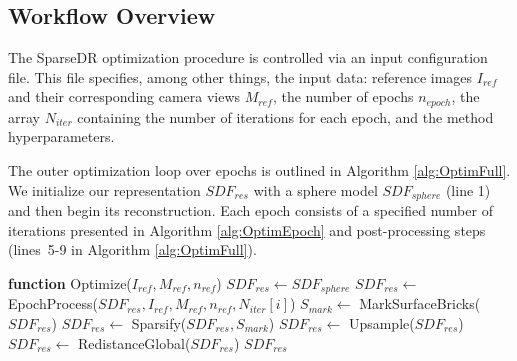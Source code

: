 \documentclass{ieeeaccess}
\begin{document}
\subsection{Workflow Overview}

The SparseDR optimization procedure is controlled via an input configuration file. This file specifies, among other things, the input data: reference images $I_{ref}$ and their corresponding camera views $M_{ref}$, the number of epochs $n_{epoch}$, the array $N_{iter}$ containing the number of iterations for each epoch, and the method hyperparameters.

The outer optimization loop over epochs is outlined in Algorithm \ref{alg:OptimFull}. We initialize our representation $SDF_{res}$ with a sphere model $SDF_{sphere}$ (line 1) and then begin its reconstruction. Each epoch consists of a specified number of iterations presented in Algorithm \ref{alg:OptimEpoch} and post-processing steps (\mbox{lines 5-9} in Algorithm \ref{alg:OptimFull}).

\begin{algorithm}[htbp]
    \caption{The outer optimization loop.}
    \label{alg:OptimFull}

    \begin{algorithmic}[1]
\item[] \textbf{function} Optimize($I_{ref}, M_{ref}, n_{ref}$)
    \STATE $SDF_{res} \leftarrow SDF_{sphere}$
        \STATE $SDF_{res} \leftarrow $ EpochProcess($SDF_{res}, I_{ref}, M_{ref}, n_{ref}, N_{iter}[i]$)
        \STATE $S_{mark} \leftarrow $ MarkSurfaceBricks($SDF_{res}$)
        \STATE $SDF_{res} \leftarrow $ Sparsify($SDF_{res}, S_{mark}$)
            \STATE $SDF_{res} \leftarrow $ Upsample($SDF_{res}$)
        \ENDIF
        \STATE $SDF_{res} \leftarrow $ RedistanceGlobal($SDF_{res}$)
    \ENDFOR
    \RETURN $SDF_{res}$
    \end{algorithmic}

\end{algorithm}
\end{document}
